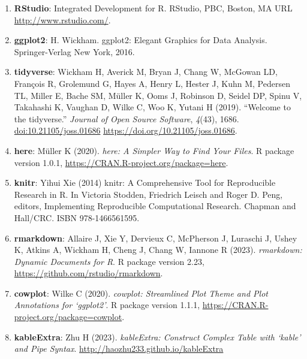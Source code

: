 \documentclass[11pt,a4paper,]{article}
\providecommand{\tightlist}{%
  \setlength{\itemsep}{0pt}\setlength{\parskip}{0pt}}
\begin{document}
\begin{enumerate}
\def\labelenumi{\arabic{enumi}.}
\tightlist
\item
  \textbf{RStudio}: Integrated Development for R. RStudio, PBC, Boston, MA URL \url{http://www.rstudio.com/}.
\item
  \textbf{ggplot2}: H. Wickham. ggplot2: Elegant Graphics for Data Analysis. Springer-Verlag New York, 2016.
\item
  \textbf{tidyverse}: Wickham H, Averick M, Bryan J, Chang W, McGowan LD, François R, Grolemund G, Hayes A, Henry L, Hester J, Kuhn M, Pedersen TL, Miller E, Bache SM, Müller K,
  Ooms J, Robinson D, Seidel DP, Spinu V, Takahashi K, Vaughan D, Wilke C, Woo K, Yutani H (2019). ``Welcome to the tidyverse.'' \emph{Journal of Open Source Software},
  \emph{4}(43), 1686. \url{doi:10.21105/joss.01686} \url{https://doi.org/10.21105/joss.01686}.
\item
  \textbf{here}: Müller K (2020). \emph{here: A Simpler Way to Find Your Files}. R package version 1.0.1, \url{https://CRAN.R-project.org/package=here}.
\item
  \textbf{knitr}: Yihui Xie (2014) knitr: A Comprehensive Tool for Reproducible Research in R. In Victoria Stodden, Friedrich Leisch and Roger D. Peng, editors, Implementing
  Reproducible Computational Research. Chapman and Hall/CRC. ISBN 978-1466561595.
\item
  \textbf{rmarkdown}: Allaire J, Xie Y, Dervieux C, McPherson J, Luraschi J, Ushey K, Atkins A, Wickham H, Cheng J, Chang W, Iannone R (2023). \emph{rmarkdown: Dynamic Documents for R}.
  R package version 2.23, \url{https://github.com/rstudio/rmarkdown}.
\item
  \textbf{cowplot}: Wilke C (2020). \emph{cowplot: Streamlined Plot Theme and Plot Annotations for `ggplot2'}. R package version 1.1.1, \url{https://CRAN.R-project.org/package=cowplot}.
\item
  \textbf{kableExtra}: Zhu H (2023). \emph{kableExtra: Construct Complex Table with `kable' and Pipe Syntax}. \url{http://haozhu233.github.io/kableExtra}
\end{enumerate}

\printbibliography
\end{document}
